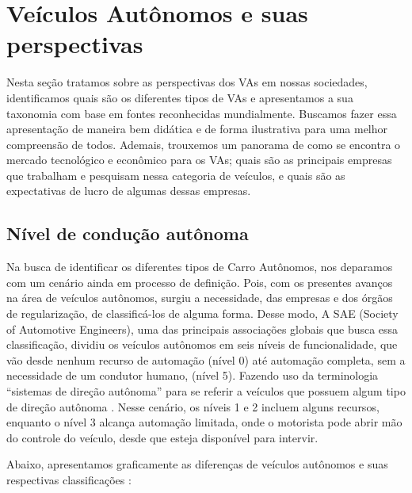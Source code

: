 \section{Veículos Autônomos e suas perspectivas}

Nesta seção tratamos sobre as perspectivas dos VAs em nossas sociedades, identificamos quais são os diferentes tipos de VAs e apresentamos a sua taxonomia com base em fontes reconhecidas mundialmente. Buscamos fazer essa apresentação de maneira bem didática e de forma ilustrativa para uma melhor compreensão de todos. Ademais, trouxemos um panorama de como se encontra o mercado tecnológico e econômico para os VAs; quais são as principais empresas que trabalham e pesquisam nessa categoria de veículos, e quais são as expectativas de lucro de algumas dessas empresas.

\subsection{Nível de condução autônoma}
	
Na busca de identificar os diferentes tipos de Carro Autônomos, nos deparamos com um cenário ainda em processo de definição. Pois, com os presentes avanços na área de veículos autônomos, surgiu a necessidade, das empresas e dos órgãos de regularização, de classificá-los de alguma forma. Desse modo, A SAE (Society of Automotive Engineers), uma das principais associações globais que busca essa classificação, dividiu os veículos autônomos em seis níveis de funcionalidade, que vão desde nenhum recurso de automação (nível 0) até automação completa, sem a necessidade de um condutor humano, (nível 5). Fazendo uso da terminologia “sistemas de direção autônoma” para se referir a veículos que possuem algum tipo de direção autônoma \cite{SAE}. Nesse cenário, os níveis 1 e 2 incluem alguns recursos, enquanto o nível 3 alcança automação limitada, onde o motorista pode abrir mão do controle do veículo, desde que esteja disponível para intervir.

Abaixo, apresentamos graficamente as diferenças de veículos autônomos e suas respectivas classificações \cite{SAE}:

